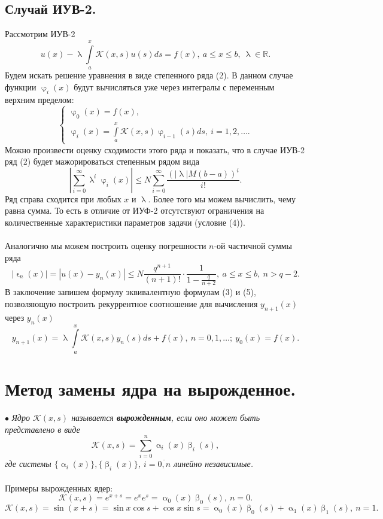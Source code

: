 \documentclass[a4paper, 12pt]{report}
\numberwithin{equation}{section}
\newcommand{\Rm}{\mathbb{R}}
\renewcommand{\leq}{\leqslant}
\renewcommand{\alpha}{\upalpha}
\renewcommand{\beta}{\upbeta}
\renewcommand{\varphi}{\upvarphi}
\renewcommand{\lambda}{\uplambda}
\renewcommand{\varepsilon}{\upvarepsilon}
\begin{document}
	\subsection{Случай ИУВ-2.}
	Рассмотрим ИУВ-2 $$u(x) - \lambda \int\limits_a^x \mathcal K(x,s)u(s)ds = f(x),\ a\leq x \leq b,\ \lambda \in \Rm.$$
	Будем искать решение уравнения в виде степенного ряда (2).
	В данном случае функции $\varphi_i(x)$ будут вычисляться уже через интегралы с переменным верхним пределом:
	\begin{equation}
		\begin{cases}
		\varphi_0(x) = f(x),\\
		\varphi_i(x) = \int\limits_a^x \mathcal K(x,s)\varphi_{i-1}(s)ds,\ i=1,2,\ldots.
	\end{cases}
	\end{equation}
	Можно произвести оценку сходимости этого ряда и показать, что в случае ИУВ-2 ряд (2) будет мажорироваться степенным рядом вида 	$$\left|\sum_{i=0}^{\infty} \lambda^i\varphi_i(x)\right|\leq N \sum_{i=0}^{\infty} \dfrac{\left(|\lambda| M(b-a)\right)^i}{i!}.$$
	Ряд справа сходится при любых $x$ и $\lambda$. Более того мы можем вычислить, чему равна сумма. То есть в отличие от ИУФ-2 отсутствуют ограничения на количественные характеристики параметров задачи (условие (4)). \\\\
	Аналогично мы можем построить оценку погрешности $n$-ой частичной суммы ряда $$|\varepsilon_n(x)| = |u(x) - y_n(x)|\leq N\dfrac{q^{n+1}}{(n+1)!}\cdot\dfrac{1}{1-\frac{q}{n+2}},\ a\leq x\leq b,\ n > q-2.$$
	В заключение запишем формулу эквивалентную формулам (3) и (5), позволяющую построить рекуррентное соотношение для вычисления $y_{n+1}(x)$ через $y_n(x)$
	\begin{equation}
		y_{n+1}(x) = \lambda \int\limits_a^x \mathcal K(x,s)y_n(s)ds + f(x),\ n=0,1,\ldots;\ y_0(x) = f(x).
	\end{equation}
	\section{Метод замены ядра на вырожденное.}
	$\bullet$ \textit{Ядро $\mathcal K(x,s)$ называется \textbf{вырожденным}, если оно может быть представлено в виде \begin{equation}
			\mathcal K(x,s) = \sum_{i=0}^{n}\alpha_i(x)\beta_i(s),
		\end{equation}
	где системы $\{\alpha_i(x)\}, \{\beta_i(x)\}$, $i=\overline{0,n}$ линейно независимые.}\\\\
	Примеры вырожденных ядер: $$\mathcal K (x,s) = e^{x+s} = e^x e^s = \alpha_0(x)\beta_0(s),\ n=0.$$
	$$\mathcal K(x,s) = \sin (x+s) = \sin x \cos s +\cos x \sin s = \alpha_0(x) \beta_0(s) + \alpha_1(x)\beta _1(s),\ n=1.$$
\end{document}
